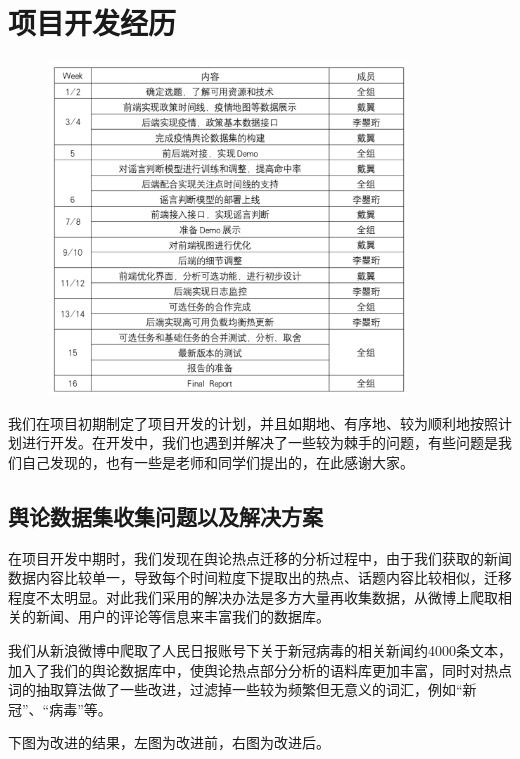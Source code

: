 \documentclass{article}
\begin{document}
\section{项目开发经历}

\begin{figure}[H]
\centering
\includegraphics[width=0.85\textwidth]{sche.png}
\end{figure}

我们在项目初期制定了项目开发的计划，并且如期地、有序地、较为顺利地按照计划进行开发。在开发中，我们也遇到并解决了一些较为棘手的问题，有些问题是我们自己发现的，也有一些是老师和同学们提出的，在此感谢大家。


\subsection{舆论数据集收集问题以及解决方案}

在项目开发中期时，我们发现在舆论热点迁移的分析过程中，由于我们获取的新闻数据内容比较单一，导致每个时间粒度下提取出的热点、话题内容比较相似，迁移程度不太明显。对此我们采用的解决办法是多方大量再收集数据，从微博上爬取相关的新闻、用户的评论等信息来丰富我们的数据库。

我们从新浪微博中爬取了人民日报账号下关于新冠病毒的相关新闻约4000条文本，加入了我们的舆论数据库中，使舆论热点部分分析的语料库更加丰富，同时对热点词的抽取算法做了一些改进，过滤掉一些较为频繁但无意义的词汇，例如“新冠”、“病毒”等。

下图为改进的结果，左图为改进前，右图为改进后。
\end{document}
